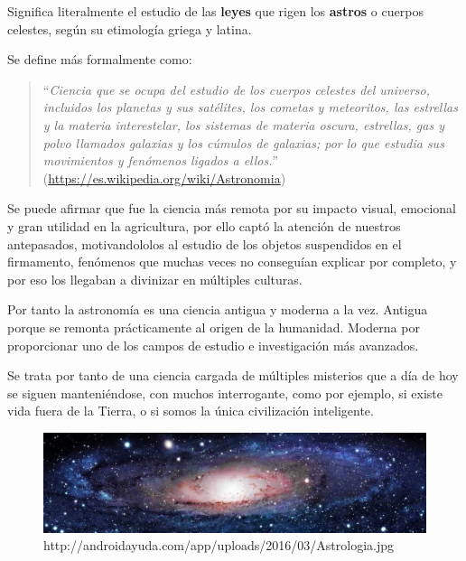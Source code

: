 \bigskip
Significa literalmente el estudio de las \textbf{leyes} que rigen los \textbf{astros} o cuerpos celestes, según su etimología griega y latina.

\bigskip
Se define más formalmente como:

\begin{quote}``\textit{Ciencia que se ocupa del estudio de los cuerpos celestes del universo, incluidos los planetas y sus satélites, los cometas y meteoritos, las estrellas y la materia interestelar,
  los sistemas de materia oscura, estrellas, gas y polvo llamados galaxias y los cúmulos de galaxias; por lo que estudia sus movimientos y fenómenos ligados a ellos.}''
\newline(\href{https://es.wikipedia.org/wiki/Astronom%C3%ADa}{https://es.wikipedia.org/wiki/Astronomia})
\end{quote}

\bigskip
Se puede afirmar que fue la ciencia más remota por su impacto visual, emocional y gran utilidad en la agricultura, por ello captó la atención de nuestros antepasados, motivandololos al estudio de los objetos suspendidos en el firmamento, fenómenos que muchas veces no conseguían explicar por completo, y por eso los llegaban a divinizar en múltiples culturas.

\bigskip
Por tanto la  astronomía es una ciencia antigua y moderna a la vez. \newline
Antigua porque se remonta prácticamente al origen de la humanidad.\newline
Moderna por proporcionar uno de los campos de estudio e investigación más avanzados.

\bigskip
Se trata por tanto de una ciencia cargada de múltiples misterios que a día de hoy se siguen manteniéndose, con muchos interrogante, como por ejemplo, si existe vida fuera de la Tierra, o si somos la única civilización
inteligente.


\begin{figure}[b]
\centering
\includegraphics[width=0.9\linewidth]{../images/astrofooter}
\caption[Galaxia]{http://androidayuda.com/app/uploads/2016/03/Astrologia.jpg}
\label{fig:astrofooter}
\end{figure}


